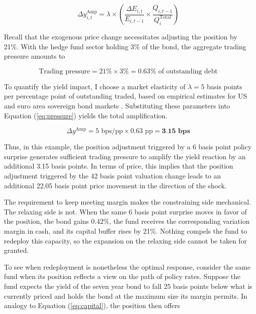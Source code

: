 \documentclass[english, 11pt, oneside]{article}
\begin{document}
\begin{equation}
\Delta y_{i,t}^{\text{Amp}} = \lambda \times \left( \frac{\Delta E_{i,t}}{E_{i,t-1}} \times \frac{Q_{i,t-1}}{Q^{\text{Total}}_{i}} \right)
\label{eq:pressure}
\end{equation}

Recall that the exogenous price change necessitates adjusting the position by 21\%. With the hedge fund sector holding 3\% of the bond, the aggregate trading pressure amounts to

\begin{equation*}
\text{Trading pressure} = 21\% \times 3\% = 0.63\% \text{ of outstanding debt}
\end{equation*}

To quantify the yield impact, I choose a market elasticity of $\lambda = 5$ basis points per percentage point of outstanding traded, based on empirical estimates for US and euro area sovereign bond markets \citep{damico2013, eser2016, desantis2020}. Substituting these parameters into Equation (\ref{eq:pressure}) yields the total amplification.

\begin{equation*}
\Delta y^{\text{Amp}} = 5 \text{ bps/pp} \times 0.63 \text{ pp} = \textbf{3.15 bps}
\end{equation*}

Thus, in this example, the position adjustment triggered by a 6 basis point policy surprise generates sufficient trading pressure to amplify the yield reaction by an additional 3.15 basis points. In terms of price, this implies that the position adjustment triggered by the 42 basis point valuation change leads to an additional 22.05 basis point price movement in the direction of the shock.

The requirement to keep meeting margin makes the constraining side mechanical. The relaxing side is not. When the same 6 basis point surprise moves in favor of the position, the bond gains $0.42\%$, the fund receives the corresponding variation margin in cash, and its capital buffer rises by 21\%. Nothing compels the fund to redeploy this capacity, so the expansion on the relaxing side cannot be taken for granted.

To see when redeployment is nonetheless the optimal response, consider the same fund when its position reflects a view on the path of policy rates. Suppose the fund expects the yield of the seven year bond to fall 25 basis points below what is currently priced and holds the bond at the maximum size its margin permits. In analogy to Equation (\ref{eq:capital}), the position then offers
\end{document}
